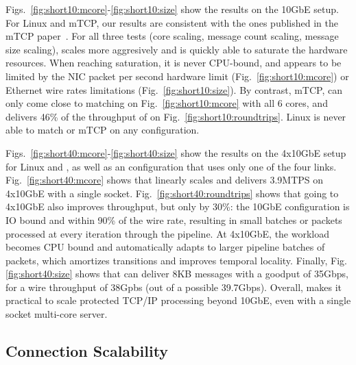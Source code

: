 
 Figs.~\ref{fig:short10:mcore}-\ref{fig:short10:size} show the results
on the 10GbE setup.  For Linux and mTCP, our results are consistent
with the ones published in the mTCP paper~\cite{jeong2014mtcp}.  For
all three tests (core scaling, message count scaling, message size
scaling), \ix scales more aggresively and is quickly able to
saturate the hardware resources.  When reaching saturation, it is never
CPU-bound, and appears to be limited by the NIC packet per second
hardware limit (Fig.~\ref{fig:short10:mcore}) or Ethernet wire rates
limitations (Fig.~\ref{fig:short10:size}).  By contrast,  mTCP,
can only come close to matching \ix on Fig.~\ref{fig:short10:mcore} with all 6 cores, and
delivers 46\% of the throughput of \ix on
Fig.~\ref{fig:short10:roundtrips}.  Linux is never able to match \ix
or mTCP on any configuration.





Figs.~\ref{fig:short40:mcore}-\ref{fig:short40:size} show the results
on the 4x10GbE setup for Linux and \ix, as well as an \ix
configuration that uses only one of the four
links. Fig.~\ref{fig:short40:mcore} shows that \ix linearly scales and
delivers 3.9MTPS on 4x10GbE with a single socket.
Fig.~\ref{fig:short40:roundtrips} shows that going to 4x10GbE also
improves throughput, but only by 30\%: the 10GbE configuration is IO
bound and within 90\% of the wire rate, resulting in small batches or
 packets processed at every iteration through the \ix
pipeline.  At 4x10GbE, the workload becomes CPU bound and \ix automatically adapts to larger
pipeline batches of  packets, which amortizes transitions and
improves temporal locality.  Finally, Fig.\ref{fig:short40:size} shows
that \ix can deliver 8KB messages with a goodput of 35Gbps, for a wire
throughput of 38Gpbs (out of a possible 39.7Gbps).  Overall, \ix makes
it practical to scale protected TCP/IP processing beyond 10GbE, even
with a single socket multi-core server.


\subsection{Connection Scalability}

